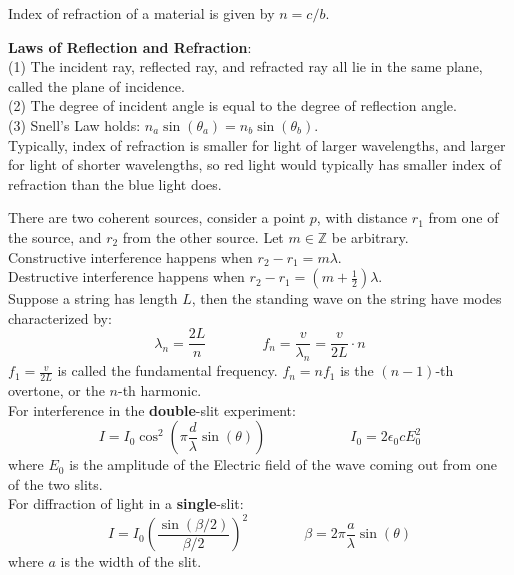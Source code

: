 \documentclass[10pt]{article}
\theoremstyle{break}
\theoremstyle{break}
\newcommand{\Z}{\mathbb{Z}}
\begin{document}
Index of refraction of a material is given by $n = c/b$.

\textbf{Laws of Reflection and Refraction}:\\
(1) The incident ray, reflected ray, and refracted ray all lie in the same plane, called the plane of incidence.\\
(2) The degree of incident angle is equal to the degree of reflection angle.\\
(3) Snell's Law holds: $n_a \sin(\theta_a) = n_b\sin(\theta_b)$.\\

Typically, index of refraction is smaller for light of larger wavelengths, and larger for light of shorter wavelengths, so red light would typically has smaller index of refraction than the blue light does. 

\newpage
There are two coherent sources, consider a point $p$, with distance $r_1$ from one of the source, and $r_2$ from the other source. Let $m \in \Z$ be arbitrary.\\
Constructive interference happens when $r_2 - r_1 = m\lambda$. \\
Destructive interference happens when $r_2 - r_1 = (m+\frac{1}{2})\lambda$. \\

Suppose a string has length $L$, then the standing wave on the string have modes characterized by:
$$\lambda_n = \frac{2L}{n} \qquad\qquad f_n =\frac{v}{\lambda_n}= \frac{v}{2L}\cdot n$$
$f_1 = \frac{v}{2L}$ is called the fundamental frequency. $f_{n} = n f_1$ is the $(n-1)$-th overtone, or the $n$-th harmonic. \\

For interference in the \textbf{double}-slit experiment:
$$I = I_0 \cos^2\left(\pi \frac{d}{\lambda} \sin(\theta)\right)\qquad\qquad\qquad I_0 = 2\epsilon_0 c E_0^2$$
where $E_0$ is the amplitude of the Electric field of the wave coming out from one of the two slits. \\

For diffraction of light in a \textbf{single}-slit:
$$I = I_0 \left(\frac{\sin(\beta/2)}{\beta/2} \right)^2 \qquad\qquad \beta = 2\pi\frac{a}{\lambda} \sin(\theta)$$
where $a$ is the width of the slit.\\
\end{document}
